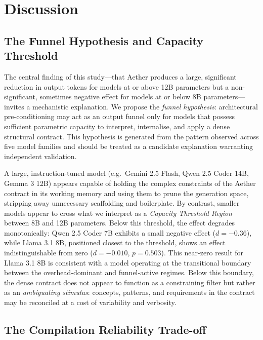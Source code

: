 \documentclass[review,12pt,3p]{elsarticle}
\begin{document}
\section{Discussion}
\label{sec:discussion}

\subsection{The Funnel Hypothesis and Capacity Threshold}

The central finding of this study---that Aether produces a large, significant reduction
in output tokens for models at or above 12B parameters but a non-significant, sometimes negative
effect for models at or below 8B parameters---invites a mechanistic explanation. We propose the
\emph{funnel hypothesis}: architectural pre-conditioning may act as an output funnel only for
models that possess sufficient parametric capacity to interpret, internalise, and apply a dense
structural contract. This hypothesis is generated from the pattern observed across five model
families and should be treated as a candidate explanation warranting independent validation.

A large, instruction-tuned model (e.g.\ Gemini 2.5 Flash, Qwen 2.5 Coder 14B, Gemma 3 12B)
appears capable of holding the complex constraints of the Aether contract in its working memory
and using them to prune the generation space, stripping away unnecessary scaffolding and
boilerplate. By contrast, smaller models appear to cross what we interpret as a
\emph{Capacity Threshold Region} between 8B and 12B parameters.
Below this threshold, the effect degrades monotonically: Qwen 2.5 Coder 7B exhibits a small
negative effect ($d = -0.36$), while Llama 3.1 8B, positioned closest to the threshold, shows
an effect indistinguishable from zero ($d = -0.010$, $p = 0.503$). This near-zero result for
Llama 3.1 8B is consistent with a model operating at the transitional boundary between the
overhead-dominant and funnel-active regimes. Below this boundary, the dense contract does not
appear to function as a constraining filter but rather as an \emph{ambiguating stimulus}:
concepts, patterns, and requirements in the contract may be reconciled at a cost of variability
and verbosity.


\subsection{The Compilation Reliability Trade-off}
\end{document}
